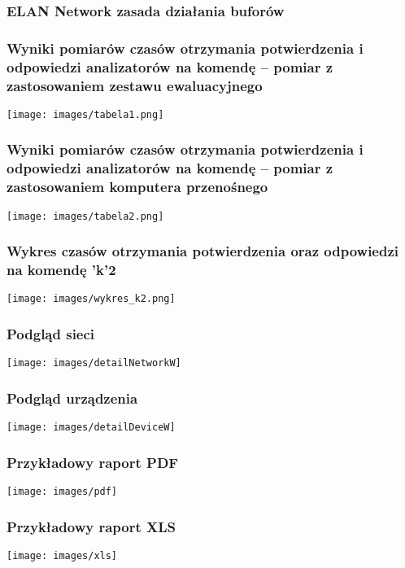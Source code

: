 \documentclass[ucs]{beamer}
\begin{document}
\begin{frame}
\frametitle{ELAN Network zasada działania buforów}

\end{frame}

\begin{frame}
\frametitle{Wyniki pomiarów czasów otrzymania potwierdzenia i odpowiedzi analizatorów na komendę – pomiar z zastosowaniem zestawu ewaluacyjnego}
\begin{center}
\texttt{[image: images/tabela1.png]}
\end{center}
\end{frame}

\begin{frame}
\frametitle{Wyniki pomiarów czasów otrzymania potwierdzenia i odpowiedzi analizatorów na komendę – pomiar z zastosowaniem komputera przenośnego}
\begin{center}
\texttt{[image: images/tabela2.png]}
\end{center}
\end{frame}

\begin{frame}
\frametitle{Wykres czasów otrzymania potwierdzenia oraz odpowiedzi na komendę 'k'2}
\begin{center}
\texttt{[image: images/wykres\_k2.png]}
\end{center}
\end{frame}

\begin{frame}
\frametitle{Podgląd sieci}
\texttt{[image: images/detailNetworkW]}
\end{frame}

\begin{frame}
\frametitle{Podgląd urządzenia}
\texttt{[image: images/detailDeviceW]}
\end{frame}

\begin{frame}
\frametitle{Przykładowy raport PDF}
\begin{center}
\texttt{[image: images/pdf]}
\end{center}
\end{frame}

\begin{frame}
\frametitle{Przykładowy raport XLS}
\begin{center}
\texttt{[image: images/xls]}
\end{center}
\end{frame}
\end{document}
